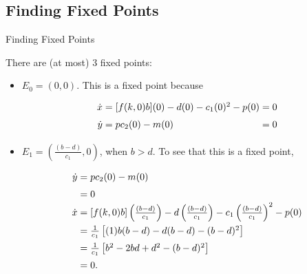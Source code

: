 \documentclass{beamer}
\begin{document}
\subsection{Finding Fixed Points}
\begin{frame}[t]{Finding Fixed Points}


There are (at most) 3 fixed points:
\begin{itemize}
\item $E_0=(0,0)$. This is a fixed point because
\[\arraycolsep=1.4pt\def\arraystretch{1.5}
\begin{array}{rcll}
\dot{x}&=&[f(k,0)b](0)-d(0)-c_1(0)^2-p(0)&=0\\
\dot{y}&=&pc_2(0)-m(0)&=0
\end{array}\]
\end{itemize}
\end{frame}
\begin{frame}


\begin{itemize}
\item $E_1=\left(\frac{(b-d)}{c_1},0\right)$, when $b>d$. To see that this is a fixed point, 
\[\arraycolsep=1.4pt\def\arraystretch{1.5}
\begin{array}{rcll}
\dot{y}&=&pc_2(0)-m(0)\\
&=&0 \\
\dot{x}&=&[f(k,0)b]\left(\frac{(b-d)}{c_1}\right)-d\left(\frac{(b-d)}{c_1}\right)-c_1\left(\frac{(b-d)}{c_1}\right)^2-p(0)\\
&=&\frac{1}{c_1}\left[(1)b(b-d)-d(b-d)-(b-d)^2\right]\\
&=&\frac{1}{c_1}\left[b^2-2bd+d^2-(b-d)^2\right]\\
&=&0.
\end{array}\]
\end{itemize}
\end{frame}
\end{document}
